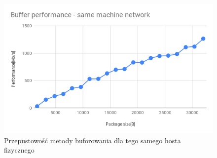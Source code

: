 \documentclass[11pt]{article}
\begin{document}
    \begin{figure}[H]
        \includegraphics[width=1\textwidth,frame]{charts/Buffer performance - same machine network.png}
        \caption{Przepustowość metody buforowania dla tego samego hosta fizycznego}
        \label{fig:buff-same-performance}
    \end{figure}
\end{document}
